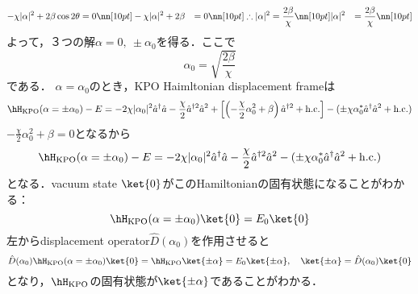 \begin{align}
    - \chi|\alpha|^2
    +2\beta\cos{2\theta}&=0\nn[10pt]
    - \chi|\alpha|^2
    +2\beta&=0\nn[10pt]
    \therefore
    |\alpha|^2
    &=\frac{2\beta}{\chi}\nn[10pt]
    |\alpha|^2
    &=\frac{2\beta}{\chi}\nn[10pt]
\end{align}
よって，３つの解$\alpha=0,\ \pm\alpha_0$を得る．ここで
\begin{equation}
    \alpha_0 = \sqrt{\frac{2\beta}{\chi}}
\end{equation}
である．
$\alpha=\alpha_0$のとき，KPO Haimltonian displacement frameは
\begin{equation}
    \hH_{\rm{KPO}}(\alpha=\pm\alpha_0)-E
    =
    - 2\chi|\alpha_0|^2\hat{a}^{\dagger}\hat{a}
    - \frac{\chi}{2}\hat{a}^{\dagger2}\hat{a}^2
    +\left[\left(- \frac{\chi}{2}\alpha_0^2+\beta\right)\hat{a}^{\dagger2}
    +{\rm{h.c.}}\right]
    - (\pm\chi\alpha_0^{\ast}\hat{a}^{\dagger}\hat{a}^2 +{\rm{h.c.}} )
\end{equation}
$- \frac{\chi}{2}\alpha_0^2+\beta=0$となるから
\begin{equation}
    \hH_{\rm{KPO}}(\alpha=\pm\alpha_0)-E
    =
    - 2\chi|\alpha_0|^2\hat{a}^{\dagger}\hat{a}
    - \frac{\chi}{2}\hat{a}^{\dagger2}\hat{a}^2
    - (\pm\chi\alpha_0^{\ast}\hat{a}^{\dagger}\hat{a}^2 +{\rm{h.c.}} )
\end{equation}
となる．vacuum state $\ket{0}$がこのHamiltonianの固有状態になることがわかる：
\begin{equation}
    \hH_{\rm{KPO}}(\alpha=\pm\alpha_0)\ket{0}
    =E_0\ket{0}
\end{equation}
左からdisplacement operator$\hat{D}(\alpha_0)$を作用させると
\begin{equation}
    \hat{D}(\alpha_0)\hH_{\rm{KPO}}(\alpha=\pm\alpha_0)\ket{0}
    =\hH_{\rm{KPO}}\ket{\pm\alpha}
    =E_0\ket{\pm\alpha},\ \ \ \ket{\pm\alpha}=\hat{D}({\alpha_0})\ket{0}
\end{equation}
となり，$\hH_{\rm{KPO}}$の固有状態が$\ket{\pm\alpha}$であることがわかる．






